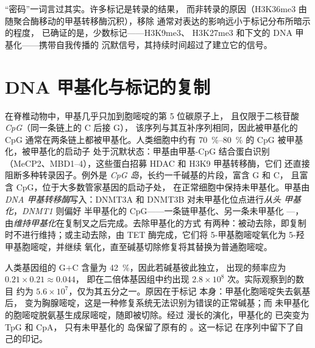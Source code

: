 \begin{remark}[“密码”还是相关性]\label{rem:b3:chromatin-epigenetics:code}
“密码”一词言过其实。许多标记是转录的结果，
而非转录的原因（H3K36me3 由
随聚合酶移动的甲基转移酶沉积），移除
通常对表达的影响远小于标记分布所暗示的程度，
已确证的是，少数标记——H3K9me3、
H3K27me3 和下文的 DNA 甲基化——携带自我传播的
沉默信号，其持续时间超过了建立它的信号。
\end{remark}

\section{DNA 甲基化与标记的复制}

\begin{definition}\label{def:b3:chromatin-epigenetics:methylation}
在脊椎动物中，甲基几乎只加到胞嘧啶的第 5 位碳原子上，
且仅限于二核苷酸\emph{CpG}（同一条链上的 C 后接 G），
该序列与其互补序列相同，因此被甲基化的
CpG 通常在两条链上都被甲基化。人类细胞中约有 \qtyrange{70}{80}{\%}
的 CpG 被甲基化，被甲基化的启动子
处于沉默状态：甲基由甲基-CpG 结合蛋白识别
（MeCP2、MBD1--4），这些蛋白招募 HDAC 和 H3K9 甲基转移酶，它们
还直接阻断多种转录因子。例外是
\emph{CpG 岛}，长约一千碱基的片段，富含 G 和 C，
且富含 CpG，位于大多数管家基因的启动子处，
在正常细胞中保持未甲基化。甲基由
\emph{DNA 甲基转移酶}写入：DNMT3A 和 DNMT3B 对未甲基化位点进行\emph{从头
甲基化}，\emph{DNMT1} 则偏好
半甲基化的 CpG——一条链甲基化、另一条未甲基化 ---，
由\emph{维持甲基化}在复制叉之后完成。去除甲基化的方式
有两种：被动去除，即复制时不进行维持；或主动去除，由 TET
酶完成，它们将 5-甲基胞嘧啶氧化为 5-羟甲基胞嘧啶，并继续
氧化，直至碱基切除修复将其替换为普通胞嘧啶。
\end{definition}

\begin{example}\label{ex:b3:chromatin-epigenetics:cpg-deficit}
人类基因组的 G$+$C 含量为 \qty{42}{\%}，因此若碱基彼此独立，
 出现的频率应为 $0.21\times 0.21 \approx 0.044$，
即在二倍体基因组中约出现 $2.8\times 10^{8}$ 次。实际观察到的数目
约为 $5.6\times 10^{7}$，仅为其五分之一。原因在于标记
本身：甲基化胞嘧啶失去氨基后，
变为胸腺嘧啶，这是一种修复系统无法识别为错误的正常碱基；而
未甲基化的胞嘧啶脱氨基生成尿嘧啶，随即被切除。经过
漫长的演化，甲基化的  已突变为 TpG 和 CpA，
只有未甲基化的  岛保留了原有的 。这一标记
在序列中留下了自己的印记。
\end{example}

